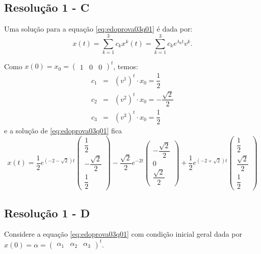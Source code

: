 \subsection*{\blue Resolução 1 - \textbf{C}}



Uma solução para a equação \eqref{eq:edoprova03q01} é dada por:
\[x(t) = \displaystyle\sum_{k=1}^{3} c_k x^k(t) = \sum_{k=1}^{3} c_k e^{\lambda_k t} v^k.
\]

Como \(x(0) = x_0 = \left(\begin{array}{ccc} 1 & 0 & 0 \end{array}\right)^t\), temos:
\[\begin{array}{rcl}
c_1 &=& (v^1)^t \cdot x_0 = \dfrac{1}{2} \\
c_2 &=& (v^2)^t \cdot x_0 = -\dfrac{\sqrt{2}}{2} \\
c_3 &=& (v^3)^t \cdot x_0 = \dfrac{1}{2}
\end{array}\]
e a solução de \eqref{eq:edoprova03q01} fica
\[
x(t) =
\dfrac{1}{2} e^{(-2-\sqrt{2}) t}
\left(\begin{array}{c}\dfrac{1}{2} \\[0.5cm] -\dfrac{\sqrt{2}}{2} \\[0.5cm] \dfrac{1}{2} \end{array}\right) 
- \dfrac{\sqrt{2}}{2} e^{-2 t}
\left(\begin{array}{c} -\dfrac{\sqrt{2}}{2} \\[0.5cm] 0 \\[0.5cm] \dfrac{\sqrt{2}}{2} \end{array}\right)
+ \dfrac{1}{2} e^{(-2+\sqrt{2}) t} 
\left(\begin{array}{c} \dfrac{1}{2} \\[0.5cm] \dfrac{\sqrt{2}}{2} \\[0.5cm] \dfrac{1}{2} \end{array}\right)
\]



\subsection*{\blue Resolução 1 - \textbf{D}}


Considere a equação \eqref{eq:edoprova03q01} com condição inicial geral dada por \(x(0) = \alpha = \left(\begin{array}{ccc} \alpha_1 & \alpha_2 & \alpha_3 \end{array}\right)^t\).

